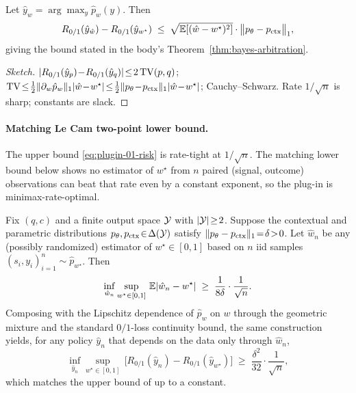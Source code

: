 \begin{lemma}
\label{lem:excess-risk-zero-one}
Let $\hat y_w=\arg\max_y \hat p_w(y)$.  Then
\begin{equation}
R_{0/1}(\hat y_{\hat w})-R_{0/1}(\hat y_{w^\star})\;\leq\;
\sqrt{\mathbb{E}[(\hat w-w^\star)^2]}\cdot\bigl\|p_\theta-p_{\mathrm{ctx}}\bigr\|_1,
\label{eq:plugin-01-risk}
\end{equation}
giving the bound stated in the body's Theorem~\ref{thm:bayes-arbitration}.
\end{lemma}

\begin{proof}[Sketch]
$|R_{0/1}(\hat y_p)\!-\!R_{0/1}(\hat y_q)|\!\le\!2\operatorname{TV}(p,q)$;
$\TV\!\le\!\tfrac12\|\partial_w\hat p_w\|_1|\hat w\!-\!w^\star|\!\le\!\tfrac12\|p_\theta\!-\!p_\ctx\|_1|\hat w\!-\!w^\star|$;
Cauchy--Schwarz.  Rate $1/\sqrt n$ is sharp; constants are slack.
\end{proof}

\paragraph{Matching Le Cam two-point lower bound.}
The upper bound \eqref{eq:plugin-01-risk} is rate-tight at
$1/\sqrt n$.  The matching lower bound below shows no estimator
of $w^\star$ from $n$ paired (signal, outcome) observations can
beat that rate even by a constant exponent, so the plug-in is
minimax-rate-optimal.

\begin{theorem}
\label{thm:lecam-lower}
Fix $(q,c)$ and a finite output space $\mathcal{Y}$ with $|\mathcal{Y}|\!\geq\!2$.
Suppose the contextual and parametric distributions
$p_\theta,p_{\mathrm{ctx}}\!\in\!\Delta(\mathcal{Y})$ satisfy
$\|p_\theta-p_{\mathrm{ctx}}\|_1\!=\!\delta\!>\!0$.  Let $\hat w_n$ be any
(possibly randomized) estimator of $w^\star\!\in\![0,1]$ based on
$n$ iid samples
$(s_i,y_i)_{i=1}^{n}\!\sim\!\hat p_{w^\star}$.  Then
\[
\inf_{\hat w_n}\sup_{w^\star\in[0,1]}\,\mathbb{E}\!\left|\hat w_n - w^\star\right|
\;\geq\;\frac{1}{8\delta}\cdot\frac{1}{\sqrt{n}}.
\]
Composing with the Lipschitz dependence of $\hat p_w$ on $w$
through the geometric mixture and the standard $0/1$-loss
continuity bound, the same construction yields, for any policy
$\hat y_n$ that depends on the data only through $\hat w_n$,
\[
\inf_{\hat y_n}\sup_{w^\star\in[0,1]}\,
\bigl[R_{0/1}(\hat y_n)-R_{0/1}(\hat y_{w^\star})\bigr]
\;\geq\;\frac{\delta^2}{32}\cdot\frac{1}{\sqrt n},
\]
which matches the upper bound of 
up to a constant.
\end{theorem}

